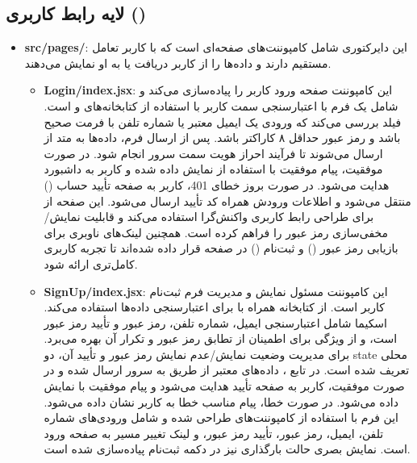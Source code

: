     \subsection{لایه رابط کاربری ()}
    	\begin{itemize}
    		\item \textbf{src/pages/}: این دایرکتوری شامل کامپوننت‌های صفحه‌ای است که با کاربر تعامل مستقیم دارند و داده‌ها را از کاربر دریافت یا به او نمایش می‌دهند.
    		\begin{itemize}
    			\item \textbf{Login/index.jsx}: این کامپوننت صفحه ورود کاربر را پیاده‌سازی می‌کند و شامل یک فرم با اعتبارسنجی سمت کاربر با استفاده از کتابخانه‌های  و  است. فیلد  بررسی می‌کند که ورودی یک ایمیل معتبر یا شماره تلفن با فرمت صحیح باشد و رمز عبور حداقل ۸ کاراکتر باشد.  
    			پس از ارسال فرم، داده‌ها به متد  از  ارسال می‌شوند تا فرآیند احراز هویت سمت سرور انجام شود. در صورت موفقیت، پیام موفقیت با استفاده از  نمایش داده شده و کاربر به داشبورد هدایت می‌شود.  
    			در صورت بروز خطای 401، کاربر به صفحه تأیید حساب () منتقل می‌شود و اطلاعات ورودش همراه کد تأیید ارسال می‌شود.  
    			این صفحه از  برای طراحی رابط کاربری واکنش‌گرا استفاده می‌کند و قابلیت نمایش/مخفی‌سازی رمز عبور را فراهم کرده است.  
    			همچنین لینک‌های ناوبری برای بازیابی رمز عبور () و ثبت‌نام () در صفحه قرار داده شده‌اند تا تجربه کاربری کامل‌تری ارائه شود.
    			\item \textbf{SignUp/index.jsx}: این کامپوننت مسئول نمایش و مدیریت فرم ثبت‌نام کاربر است. 
    			از کتابخانه  همراه با  برای اعتبارسنجی داده‌ها استفاده می‌کند. 
    			اسکیما  شامل اعتبارسنجی ایمیل، شماره تلفن، رمز عبور و تأیید رمز عبور است، و از ویژگی  برای اطمینان از تطابق رمز عبور و تکرار آن بهره می‌برد. 
    			برای مدیریت وضعیت نمایش/عدم نمایش رمز عبور و تأیید آن، دو state محلی تعریف شده است. 
    			در تابع ، داده‌های معتبر از طریق  به سرور ارسال شده و در صورت موفقیت، کاربر به صفحه تأیید هدایت می‌شود و پیام موفقیت با  نمایش داده می‌شود. 
    			در صورت خطا، پیام مناسب خطا به کاربر نشان داده می‌شود. 
    			این فرم با استفاده از کامپوننت‌های  طراحی شده و شامل ورودی‌های شماره تلفن، ایمیل، رمز عبور، تأیید رمز عبور، و لینک تغییر مسیر به صفحه ورود است. 
    			نمایش بصری حالت بارگذاری نیز در دکمه ثبت‌نام پیاده‌سازی شده است.
    			

\end{itemize}
\end{itemize}
